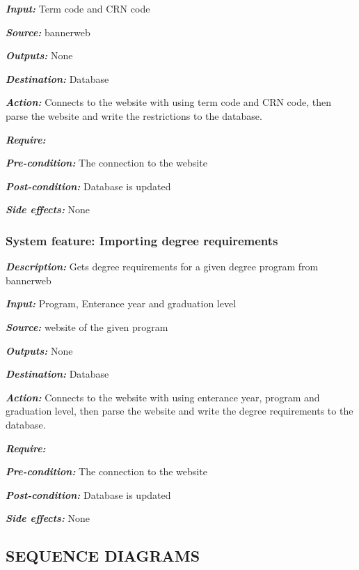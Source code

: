 \documentclass[twoside,letterpaper]{article}
\newcommand{\featuresection}[1] {
\subsubsection[System feature: #1]{\selectlanguage{english}\rmfamily\bfseries\color{black} System feature: #1}
}
\begin{document}
{\emph{\textbf{Input:}}  Term code and CRN code

\emph{\textbf{Source:}} bannerweb

\emph{\textbf{Outputs:}} None

\emph{\textbf{Destination:}} Database

\emph{\textbf{Action:}} Connects to the website with using term code and CRN code, then parse the website and write the restrictions to the database.  

\emph{\textbf{Require:}}

\emph{\textbf{Pre-condition: }} The connection to the website

\emph{\textbf{Post-condition: }} Database is updated

\emph{\textbf{Side effects:}} None



\featuresection{Importing degree requirements}
\label{sssec:importDegree}

\emph{\textbf{Description:}} Gets degree requirements for a given degree program from bannerweb

\emph{\textbf{Input:}}  Program, Enterance year and graduation level

\emph{\textbf{Source:}} website of the given program

\emph{\textbf{Outputs:}} None

\emph{\textbf{Destination:}} Database

\emph{\textbf{Action:}} Connects to the website with using enterance year, program and graduation level, then parse the website and write the degree requirements to the database.  

\emph{\textbf{Require:}}

\emph{\textbf{Pre-condition: }} The connection to the website

\emph{\textbf{Post-condition: }} Database is updated

\emph{\textbf{Side effects:}} None

\clearpage
\subsection[SEQUENCE DIAGRAMS]{\rmfamily\bfseries\color{black}
SEQUENCE DIAGRAMS}

}
\end{document}
